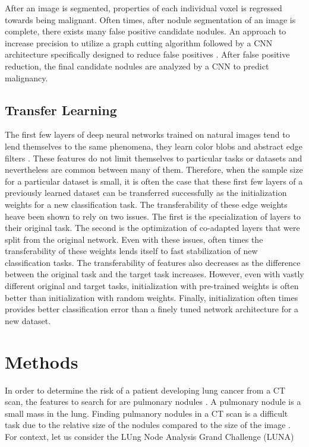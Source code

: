 \documentclass[conference,11pt]{IEEEtran}
\begin{document}
After an image is segmented, properties of each individual voxel is regressed towards being malignant. Often times, after nodule segmentation of an image is complete, there exists many false positive candidate nodules. An approach to increase precision to utilize a graph cutting algorithm followed by a CNN architecture specifically designed to reduce false positives \cite{sun_automatic_2017}. After false positive reduction, the final candidate nodules are analyzed by a CNN to predict malignancy.

\subsection{Transfer Learning}

The first few layers of deep neural networks trained on natural images tend to lend themselves to the same phenomena, they learn color blobs and abstract edge filters \cite{yosinski_how_2014}. These features do not limit themselves to particular tasks or datasets and nevertheless are common between many of them. Therefore, when the sample size for a particular dataset is small, it is often the case that these first few layers of a previously learned dataset can be transferred successfully as the initialization weights for a new classification task. The transferability of these edge weights heave been shown to rely on two issues. The first is the specialization of layers to their original task. The second is the optimization of co-adapted layers that were split from the original network. Even with these issues, often times the transferability of these weights lends itself to fast stabilization of new classification tasks. The transferability of features also decreases as the difference between the original task and the target task increases. However, even with vastly different original and target tasks, initialization with pre-trained weights is often better than initialization with random weights. Finally, initialization often times provides better classification error than a finely tuned network architecture for a new dataset.

\section{Methods}

In order to determine the risk of a patient developing lung cancer from a CT scan, the features to search for are pulmonary nodules \cite{armato_lung_2011}. A pulmonary nodule is a small mass in the lung.  Finding pulmanory nodules in a CT scan is a difficult task due to the relative size of the nodules compared to the size of the image \cite{vansteenkiste_predicting_nodate}. For context, let us consider the  LUng Node Analysis Grand Challenge (LUNA) \cite{}
\end{document}
